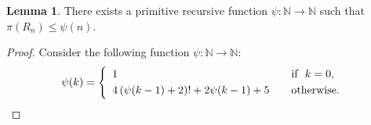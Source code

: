 \documentclass[11pt,a4paper]{amsart}
\theoremstyle{definition}
\newtheorem{lemma}[theorem]{Lemma}
\newcommand{\potential}[1]{\pi(#1)}
\begin{document}
\begin{lemma}\label{prop-Rn-potential-upperbound}
    There exists a primitive recursive function $\psi : \mathbb{N} \to \mathbb{N}$ such that $\potential{R_n} \leq \psi(n)$.
\end{lemma}

\begin{proof}
	Consider the following function $\psi : \mathbb{N} \to \mathbb{N}$:
	\begin{equation*}
  \psi(k) = \left\{\begin{array}{r@{}l@{\qquad}l}
    & 1 & \text{if }\ k = 0, \\[\jot]
    & 4 \left( \psi(k-1) + 2 \right)! + 2 \psi(k-1) + 5 & \text{otherwise.}
  \end{array}\right.
\end{equation*}


\end{proof}
\end{document}
